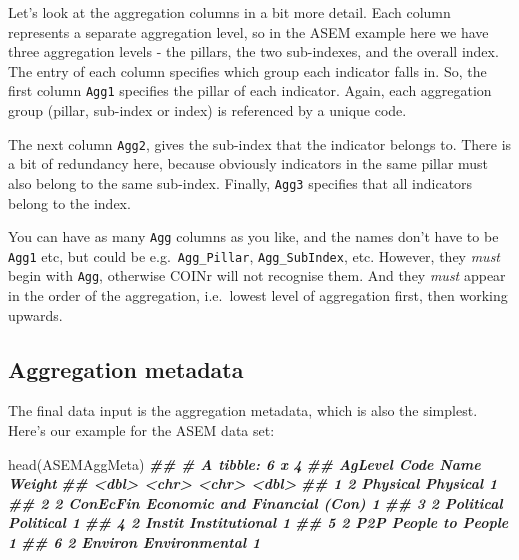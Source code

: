\documentclass[
]{book}
\newenvironment{Shaded}{\begin{snugshade}}{\end{snugshade}}
\newcommand{\DocumentationTok}[1]{\textcolor[rgb]{0.56,0.35,0.01}{\textbf{\textit{#1}}}}
\newcommand{\FunctionTok}[1]{\textcolor[rgb]{0.00,0.00,0.00}{#1}}
\newcommand{\NormalTok}[1]{#1}
\begin{document}
Let's look at the aggregation columns in a bit more detail. Each column represents a separate aggregation level, so in the ASEM example here we have three aggregation levels - the pillars, the two sub-indexes, and the overall index. The entry of each column specifies which group each indicator falls in. So, the first column \texttt{Agg1} specifies the pillar of each indicator. Again, each aggregation group (pillar, sub-index or index) is referenced by a unique code.

The next column \texttt{Agg2}, gives the sub-index that the indicator belongs to. There is a bit of redundancy here, because obviously indicators in the same pillar must also belong to the same sub-index. Finally, \texttt{Agg3} specifies that all indicators belong to the index.

You can have as many \texttt{Agg} columns as you like, and the names don't have to be \texttt{Agg1} etc, but could be e.g.~\texttt{Agg\_Pillar}, \texttt{Agg\_SubIndex}, etc. However, they \emph{must} begin with \texttt{Agg}, otherwise COINr will not recognise them. And they \emph{must} appear in the order of the aggregation, i.e.~lowest level of aggregation first, then working upwards.

\hypertarget{aggregation-metadata}{%
\subsection{Aggregation metadata}\label{aggregation-metadata}}

The final data input is the aggregation metadata, which is also the simplest. Here's our example for the ASEM data set:

\begin{Shaded}
\begin{Highlighting}[]
\FunctionTok{head}\NormalTok{(ASEMAggMeta)}
\DocumentationTok{\#\# \# A tibble: 6 x 4}
\DocumentationTok{\#\#   AgLevel Code      Name                         Weight}
\DocumentationTok{\#\#     \textless{}dbl\textgreater{} \textless{}chr\textgreater{}     \textless{}chr\textgreater{}                         \textless{}dbl\textgreater{}}
\DocumentationTok{\#\# 1       2 Physical  Physical                          1}
\DocumentationTok{\#\# 2       2 ConEcFin  Economic and Financial (Con)      1}
\DocumentationTok{\#\# 3       2 Political Political                         1}
\DocumentationTok{\#\# 4       2 Instit    Institutional                     1}
\DocumentationTok{\#\# 5       2 P2P       People to People                  1}
\DocumentationTok{\#\# 6       2 Environ   Environmental                     1}
\end{Highlighting}
\end{Shaded}
\end{document}
